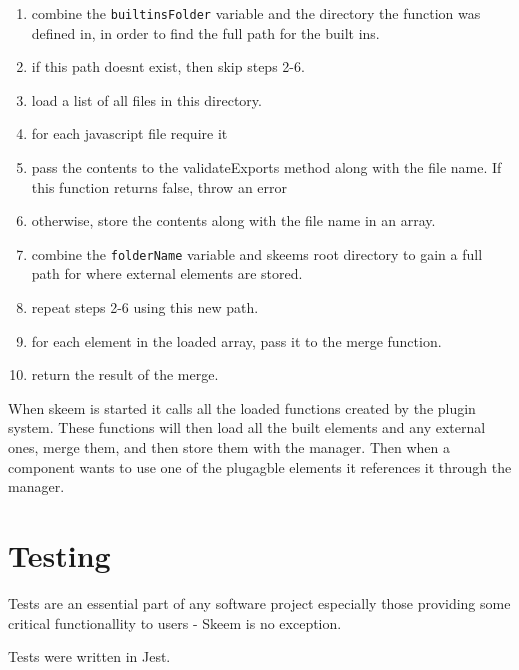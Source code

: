 \documentclass[
  12pt,
]{article}
\newcommand{\passthrough}[1]{#1}
\providecommand{\tightlist}{%
  \setlength{\itemsep}{0pt}\setlength{\parskip}{0pt}}
\begin{document}
\begin{enumerate}
\def\labelenumi{\arabic{enumi}.}
\tightlist
\item
  combine the \passthrough{\lstinline!builtinsFolder!} variable and the
  directory the function was defined in, in order to find the full path
  for the built ins.
\item
  if this path doesnt exist, then skip steps 2-6.
\item
  load a list of all files in this directory.
\item
  for each javascript file require it
\item
  pass the contents to the validateExports method along with the file
  name. If this function returns false, throw an error
\item
  otherwise, store the contents along with the file name in an array.
\item
  combine the \passthrough{\lstinline!folderName!} variable and skeems
  root directory to gain a full path for where external elements are
  stored.
\item
  repeat steps 2-6 using this new path.
\item
  for each element in the loaded array, pass it to the merge function.
\item
  return the result of the merge.
\end{enumerate}

When skeem is started it calls all the loaded functions created by the
plugin system. These functions will then load all the built elements and
any external ones, merge them, and then store them with the manager.
Then when a component wants to use one of the plugagble elements it
references it through the manager.

\label{testing}

\hypertarget{testing}{%
\section{Testing}\label{testing}}

Tests are an essential part of any software project especially those
providing some critical functionallity to users - Skeem is no exception.

Tests were written in Jest.
\end{document}
